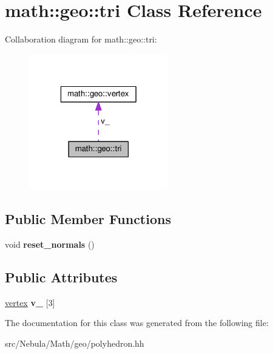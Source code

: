\hypertarget{classmath_1_1geo_1_1tri}{\section{math\-:\-:geo\-:\-:tri Class Reference}
\label{classmath_1_1geo_1_1tri}
}


Collaboration diagram for math\-:\-:geo\-:\-:tri\-:
\nopagebreak
\begin{figure}[H]
\begin{center}
\leavevmode
\includegraphics[width=172pt]{classmath_1_1geo_1_1tri__coll__graph}
\end{center}
\end{figure}
\subsection*{Public Member Functions}
\begin{DoxyCompactItemize}
\item 
\hypertarget{classmath_1_1geo_1_1tri_a9781ddeac1d6e0795ede6818f1ca52b8}{void {\bfseries reset\-\_\-normals} ()}\label{classmath_1_1geo_1_1tri_a9781ddeac1d6e0795ede6818f1ca52b8}

\end{DoxyCompactItemize}
\subsection*{Public Attributes}
\begin{DoxyCompactItemize}
\item 
\hypertarget{classmath_1_1geo_1_1tri_a1578bb4ca85d7adabc44b48e1fbbbe29}{\hyperlink{classmath_1_1geo_1_1vertex}{vertex} {\bfseries v\-\_\-} \mbox{[}3\mbox{]}}\label{classmath_1_1geo_1_1tri_a1578bb4ca85d7adabc44b48e1fbbbe29}

\end{DoxyCompactItemize}


The documentation for this class was generated from the following file\-:\begin{DoxyCompactItemize}
\item 
src/\-Nebula/\-Math/geo/polyhedron.\-hh\end{DoxyCompactItemize}
